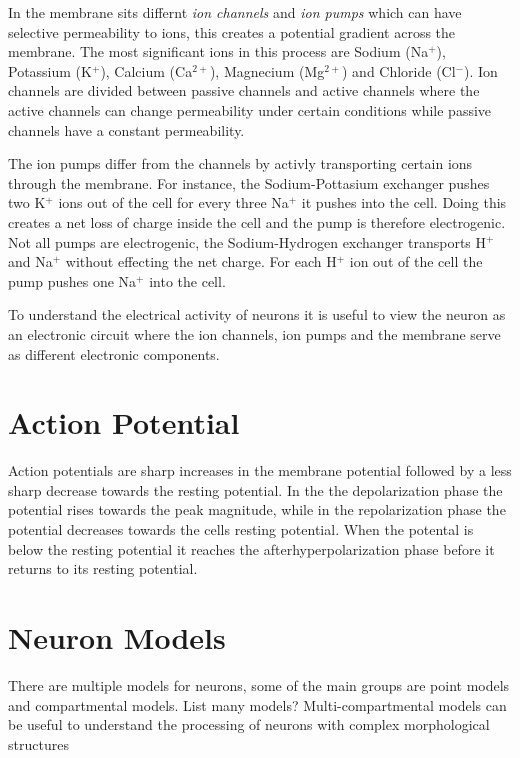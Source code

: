 \documentclass[altfont, fleqn]{uiophd}
\begin{document}
In the membrane sits differnt \emph{ion channels} and 
\emph{ion pumps} which can have selective permeability to ions, this creates 
a potential gradient across the membrane. 
The most significant ions in this process are Sodium (Na$^+$), Potassium (K$^+$), 
Calcium (Ca$^{2+}$), Magnecium (Mg$^{2+}$) and Chloride (Cl$^{-}$). 
Ion channels are divided between passive channels and 
active channels where the active channels can change 
permeability under certain conditions while passive channels have a constant
permeability. 

The ion pumps differ from the channels by activly transporting certain
ions through the membrane. 
For instance, the Sodium-Pottasium exchanger pushes two K$^+$ ions out of the cell
for every three Na$^+$ it pushes into the cell. Doing this creates a net 
loss of charge inside the cell and the pump is therefore electrogenic. 
Not all pumps are electrogenic, the Sodium-Hydrogen exchanger transports
H$^+$ and Na$^+$ without effecting the net charge.
For each H$^+$ ion out of the cell the pump pushes one Na$^+$
into the cell. 

To understand the electrical activity of neurons it is useful
to view the neuron as an electronic circuit where the ion channels, ion pumps
and the membrane serve as different electronic components.

\textcites{hodgkin_quantitative_1952,connor_prediction_1971,sterratt_principles_2011}


\section{Action Potential}
Action potentials are sharp increases in the membrane potential
followed by a less sharp decrease towards the resting potential. 
In the the depolarization phase the potential rises towards the peak magnitude, 
while in the repolarization phase the potential decreases towards
the cells resting potential.
When the potental is below the resting potential 
it reaches the afterhyperpolarization phase before
it returns to its resting potential.

\section{Neuron Models}
There are multiple models for neurons, some of the main groups are 
point models and compartmental models. List many models?
Multi-compartmental models 
can be useful to understand the processing of neurons with
complex morphological structures
\end{document}
